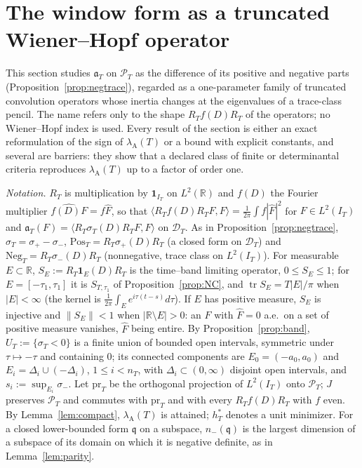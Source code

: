 \documentclass[11pt]{amsart}
\theoremstyle{definition}
\theoremstyle{remark}
\newcommand{\R}{\mathbb R}
\newcommand{\PT}{\mathcal P_T}
\newcommand{\IT}{I_T}
\newcommand{\lamA}{\lambda_{\mathrm A}(T)}
\newcommand{\sT}{\sigma_T}
\newcommand{\Fh}{\widehat F}
\begin{document}
\section{The window form as a truncated Wiener--Hopf operator}\label{sec:wh}

This section studies $\mathfrak a_T$ on $\PT$ as the difference of its positive and negative parts
(Proposition~\ref{prop:negtrace}), regarded as a one-parameter family of truncated convolution operators
whose inertia changes at the eigenvalues of a trace-class pencil. The name refers only to the shape
$R_Tf(D)R_T$ of the operators; no Wiener--Hopf index is used. Every result of the section is either an exact
reformulation of the sign of $\lamA$ or a bound with explicit constants, and several are barriers: they show
that a declared class of finite or determinantal criteria reproduces $\lamA$ up to a factor of order one.

\emph{Notation.} $R_T$ is multiplication by $\mathbf 1_{\IT}$ on $L^2(\R)$ and $f(D)$ the Fourier multiplier
$\widehat{f(D)F}=f\Fh$, so that $\langle R_Tf(D)R_TF,F\rangle=\frac1{2\pi}\int f|\Fh|^2$ for $F\in L^2(\IT)$ and
$\mathfrak a_T(F)=\langle R_T\sT(D)R_TF,F\rangle$ on $\mathcal D_T$. As in Proposition~\ref{prop:negtrace},
$\sT=\sigma_+-\sigma_-$, $\mathrm{Pos}_T=R_T\sigma_+(D)R_T$ (a closed form on $\mathcal D_T$) and
$\mathrm{Neg}_T=R_T\sigma_-(D)R_T$ (nonnegative, trace class on $L^2(\IT)$). For measurable $E\subset\R$,
$S_E:=R_T\mathbf 1_E(D)R_T$ is the time--band limiting operator, $0\le S_E\le1$; for $E=[-\tau_1,\tau_1]$ it is
$S_{T,\tau_1}$ of Proposition~\ref{prop:NC}, and $\operatorname{tr}S_E=T|E|/\pi$ when $|E|<\infty$ (the kernel is
$\frac1{2\pi}\int_Ee^{i\tau(t-s)}d\tau$). If $E$ has positive measure, $S_E$ is injective and $\|S_E\|<1$ when
$|\R\setminus E|>0$: an $F$ with $\Fh=0$ a.e.\ on a set of positive measure vanishes, $\Fh$ being entire. By
Proposition~\ref{prop:band}, $U_T:=\{\sT<0\}$ is a finite union of bounded open intervals, symmetric under
$\tau\mapsto-\tau$ and containing $0$; its connected components are $E_0=(-a_0,a_0)$ and
$E_i=\Delta_i\cup(-\Delta_i)$, $1\le i<n_T$, with $\Delta_i\subset(0,\infty)$ disjoint open intervals, and
$s_i:=\sup_{E_i}\sigma_-$. Let $\mathrm{pr}_T$ be the orthogonal projection of $L^2(\IT)$ onto $\PT$; $J$
preserves $\PT$ and commutes with $\mathrm{pr}_T$ and with every $R_Tf(D)R_T$ with $f$ even. By
Lemma~\ref{lem:compact}, $\lamA$ is attained; $h^*_T$ denotes a unit minimizer. For a closed lower-bounded form
$\mathfrak q$ on a subspace, $n_-(\mathfrak q)$ is the largest dimension of a subspace of its domain on which it
is negative definite, as in Lemma~\ref{lem:parity}.
\end{document}
